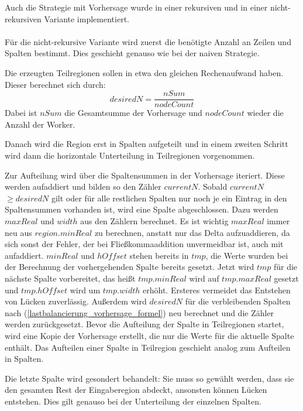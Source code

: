 Auch die Strategie mit Vorhersage wurde in einer rekursiven und in einer nicht-rekursiven Variante implementiert.

\paragraph*{} \label{lastbalancierung_vorhersage}
Für die nicht-rekursive Variante wird zuerst die benötigte Anzahl an Zeilen und Spalten bestimmt.
Dies geschieht genauso wie bei der naiven Strategie.

Die erzeugten Teilregionen sollen in etwa den gleichen Rechenaufwand haben. Dieser berechnet sich durch:
\begin{equation} \label{lastbalancierung_vorhersage_formel}
	desiredN = \frac{nSum}{nodeCount}
\end{equation}
Dabei ist $nSum$ die Gesamtsumme der Vorhersage und $nodeCount$ wieder die Anzahl der Worker.

Danach wird die Region erst in Spalten aufgeteilt und in einem zweiten Schritt wird dann die horizontale Unterteilung in Teilregionen vorgenommen.

Zur Aufteilung wird über die Spaltensummen in der Vorhersage iteriert. Diese werden aufaddiert und bilden so den Zähler $currentN$.
Sobald $currentN$ $\geq desiredN$ gilt oder für alle restlichen Spalten nur noch je ein Eintrag in den Spaltensummen vorhanden ist, wird eine Spalte abgeschlossen.
Dazu werden $maxReal$ und $width$ aus den Zählern berechnet. Es ist wichtig $maxReal$ immer neu aus $region.minReal$ zu berechnen, anstatt nur das Delta aufzuaddieren, da sich sonst der Fehler, der bei Fließkommaaddition unvermeidbar ist, auch mit aufaddiert. $minReal$ und $hOffset$ stehen bereits in $tmp$, die Werte wurden bei der Berechnung der vorhergehenden Spalte bereits gesetzt.
Jetzt wird $tmp$ für die nächste Spalte vorbereitet, das heißt $tmp.minReal$ wird auf $tmp.maxReal$ gesetzt und $tmp.hOffset$ wird um $tmp.width$ erhöht. Ersteres vermeidet das Entstehen von Lücken zuverlässig.
Außerdem wird $desiredN$ für die verbleibenden Spalten nach (\ref{lastbalancierung_vorhersage_formel}) neu berechnet und die Zähler werden zurückgesetzt.
Bevor die Aufteilung der Spalte in Teilregionen startet, wird eine Kopie der Vorhersage erstellt, die nur die Werte für die aktuelle Spalte enthält.
Das Aufteilen einer Spalte in Teilregion geschieht analog zum Aufteilen in Spalten.

Die letzte Spalte wird gesondert behandelt: Sie muss so gewählt werden, dass sie den gesamten Rest der Eingaberegion abdeckt, ansonsten können Lücken entstehen.
Dies gilt genauso bei der Unterteilung der einzelnen Spalten.

